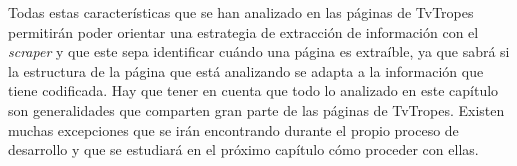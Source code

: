 Todas estas características que se han analizado en las páginas de TvTropes
permitirán poder orientar una estrategia de extracción de información con el
\textit{scraper} y que este sepa identificar cuándo una página es extraíble, ya
que sabrá si la estructura de la página que está analizando se adapta a la
información que tiene codificada. Hay que tener en cuenta que todo lo analizado
en este capítulo son generalidades que comparten gran parte de las páginas de
TvTropes. Existen muchas excepciones que se irán encontrando durante el propio
proceso de desarrollo y que se estudiará en el próximo capítulo cómo proceder
con ellas.